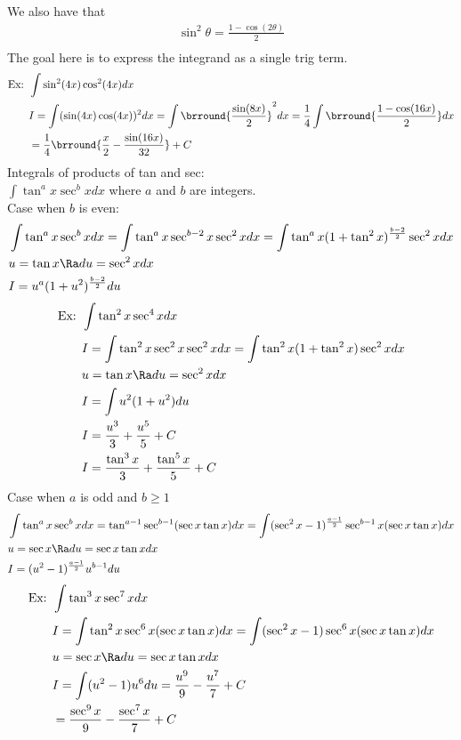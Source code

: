 We also have that
\begin{align*}
    \sin^2\theta=\frac{1-\cos(2\theta)}{2}\\
\end{align*}
The goal here is to express the integrand as a single trig term.
\begin{align*}
    \text{Ex: }&\int\sin^2(4x)\cos^2(4x)dx\\
    &I=\int(\sin(4x)\cos(4x))^2dx=\int\brround{\frac{\sin(8x)}{2}}^2dx=\frac{1}{4}\int\brround{\frac{1-\cos(16x)}{2}}dx\\
    &=\frac{1}{4}\brround{\frac{x}{2}-\frac{\sin(16x)}{32}}+C
\end{align*}
Integrals of products of tan and sec:\\
$\int\tan^ax\sec^bxdx$ where $a$ and $b$ are integers.\\
Case when $b$ is even:
\begin{align*}
    &\int\tan^ax\sec^bxdx=\int\tan^ax\sec^{b-2}x\sec^2xdx=\int\tan^ax(1+\tan^2x)^{\frac{b-2}{2}}\sec^2xdx\\
    &u=\tan x\Ra du=\sec^2xdx\\
    &I=u^a(1+u^2)^{\frac{b-2}{2}}du
\end{align*}
\begin{align*}
    \text{Ex: }&\int\tan^2x\sec^4xdx\\
    &I=\int\tan^2x\sec^2x\sec^2xdx=\int\tan^2x(1+\tan^2x)\sec^2xdx\\
    &u=\tan x\Ra du=\sec^2xdx\\
    &I=\int u^2(1+u^2)du\\
    &I=\frac{u^3}{3}+\frac{u^5}{5}+C\\
    &I=\frac{\tan^3x}{3}+\frac{\tan^5x}{5}+C
\end{align*}
Case when $a$ is odd and $b\geq 1$
\begin{align*}
    &\int\tan^ax\sec^bxdx=\tan^{a-1}\sec^{b-1}(\sec x\tan x)dx=\int(\sec^2x-1)^{\frac{a-1}{2}}\sec^{b-1}x(\sec x\tan x)dx\\
    &u=\sec x\Ra du=\sec x\tan xdx\\
    &I=(u^2-1)^{\frac{a-1}{2}}u^{b-1}du
\end{align*}
\begin{align*}
    \text{Ex: }&\int\tan^3x\sec^7xdx\\
    &I=\int\tan^2x\sec^6x(\sec x\tan x)dx=\int(\sec^2x-1)\sec^6x(\sec x\tan x)dx\\
    &u=\sec x\Ra du=\sec x\tan x dx\\
    &I=\int(u^2-1)u^6du=\frac{u^9}{9}-\frac{u^7}{7}+C\\
    &=\frac{\sec^9x}{9}-\frac{\sec^7x}{7}+C
\end{align*}

